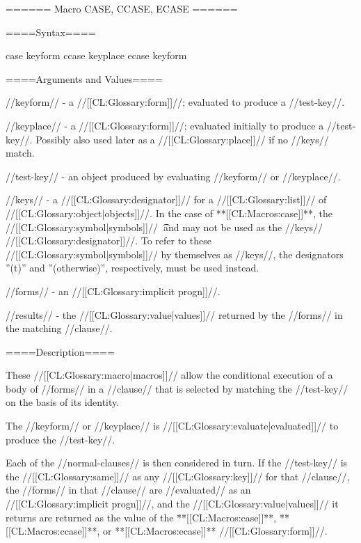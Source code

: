 ====== Macro CASE, CCASE, ECASE ======

====Syntax====

\DefmacWithValues case {keyform  } {} \DefmacWithValues ccase {keyplace } {} \DefmacWithValues ecase {keyform } {}

   

====Arguments and Values====

//keyform// - a //[[CL:Glossary:form]]//; evaluated to produce a //test-key//.

//keyplace// - a //[[CL:Glossary:form]]//; evaluated initially to produce a //test-key//. Possibly also used later as a //[[CL:Glossary:place]]// if no //keys// match.

//test-key// - an object produced by evaluating //keyform// or //keyplace//.

//keys// - a //[[CL:Glossary:designator]]// for a //[[CL:Glossary:list]]// of //[[CL:Glossary:object|objects]]//. In the case of **[[CL:Macros:case]]**, the //[[CL:Glossary:symbol|symbols]]// \t\ and  may not be used as the //keys// //[[CL:Glossary:designator]]//. To refer to these //[[CL:Glossary:symbol|symbols]]// by themselves as //keys//, the designators ''(t)'' and ''(otherwise)'', respectively, must be used instead.

//forms// - an //[[CL:Glossary:implicit progn]]//.

//results// - the //[[CL:Glossary:value|values]]// returned by the //forms// in the matching //clause//.

====Description====

These //[[CL:Glossary:macro|macros]]// allow the conditional execution of a body of //forms// in a //clause// that is selected by matching the //test-key// on the basis of its identity.

The //keyform// or //keyplace// is //[[CL:Glossary:evaluate|evaluated]]// to produce the //test-key//.

Each of the //normal-clauses// is then considered in turn. If the //test-key// is the //[[CL:Glossary:same]]// as any //[[CL:Glossary:key]]// for that //clause//, the //forms// in that //clause// are //evaluated// as an //[[CL:Glossary:implicit progn]]//, and the //[[CL:Glossary:value|values]]// it returns are returned as the value of the **[[CL:Macros:case]]**, **[[CL:Macros:ccase]]**, or **[[CL:Macros:ecase]]** //[[CL:Glossary:form]]//.

